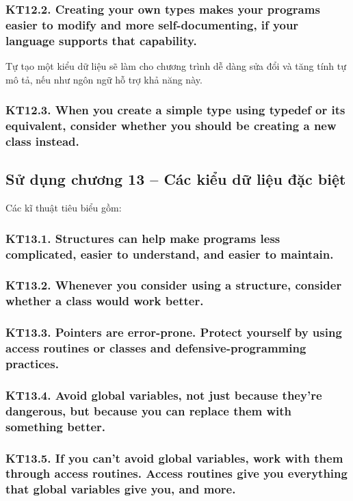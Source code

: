 \documentclass[12pt]{report}
\begin{document}
\subsubsection{KT12.2. Creating your own types makes your programs easier to modify and more self-documenting, if your language supports that capability.}
Tự tạo một kiểu dữ liệu sẽ làm cho chương trình dễ dàng sửa đổi và tăng tính tự mô tả, nếu như ngôn ngữ hỗ trợ khả năng này.



\subsubsection{KT12.3. When you create a simple type using typedef or its equivalent, consider whether you should be creating a new class instead.}


\subsection{Sử dụng chương 13 – Các kiểu dữ liệu đặc biệt}
\noindent Các kĩ thuật tiêu biểu gồm:

\subsubsection{KT13.1. Structures can help make programs less complicated, easier to understand, and easier to maintain.}

\subsubsection{KT13.2. Whenever you consider using a structure, consider whether a class would work better.}

\subsubsection{KT13.3. Pointers are error-prone. Protect yourself by using access routines or classes and defensive-programming practices.}

\subsubsection{KT13.4. Avoid global variables, not just because they're dangerous, but because you can replace them with something better.}

\subsubsection{KT13.5. If you can't avoid global variables, work with them through access routines. Access routines give you everything that global variables give you, and more.}
\end{document}
